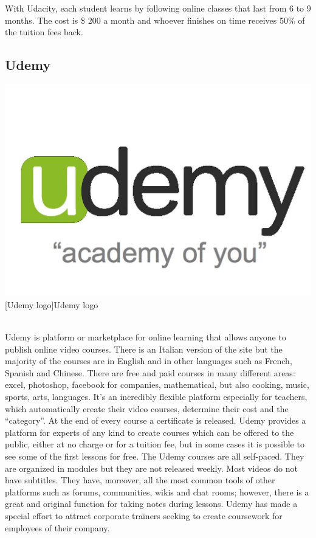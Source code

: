 With Udacity, each student learns by following online classes that last from 6 to 9 months. The cost is \$ 200 a month and whoever finishes on time receives 50\% of the tuition fees back.



\subsection{Udemy}
\label{subsec:udemy}

\begin{minipage}{\linewidth}
      \centering
      \includegraphics[width=0.4\linewidth]{images/chapter1/udemy.jpg}
      [Udemy logo]{Udemy logo}
  \end{minipage}
  \\

Udemy is platform or marketplace for online learning that allows anyone to publish online video  courses. There is an Italian version of the site but the majority of the courses are in English and in other languages such as French, Spanish and Chinese.
There are free and paid courses in many different areas: excel, photoshop, facebook for companies, mathematical, but also cooking, music, sports, arts, languages.
It's an incredibly flexible platform especially for teachers, which automatically create their video courses, determine their cost and the “category”.
At the end of every course a certificate is released. Udemy provides a platform for experts of any kind to create courses which can be offered to the public, either at no charge or for a tuition fee, but in some cases it is possible to see some of the first lessons for free.
The Udemy courses are all self-paced. They are organized in modules but they are not released weekly. Most videos do not have subtitles. They have, moreover, all the most common tools of other platforms such as forums, communities, wikis and chat rooms; however, there is a great and original function for taking notes during lessons.
Udemy has made a special effort to attract corporate trainers seeking to create coursework for employees of their company.\cite{mooc_udemy}